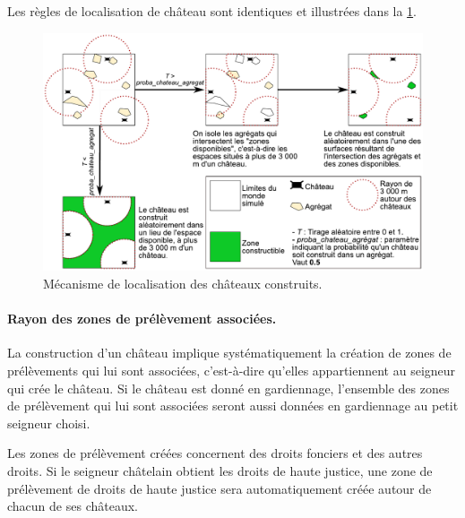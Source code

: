 Les règles de localisation de château sont identiques et illustrées dans la \cref{fig:construction-chateaux}.

\begin{figure}[H]
	\centering
	\includegraphics[width=\linewidth]{img/construction_chateaux.pdf}
	\caption{Mécanisme de localisation des châteaux construits.}
	\label{fig:construction-chateaux}
\end{figure}

\paragraph{Rayon des zones de prélèvement associées.}
La construction d'un château implique systématiquement la création de zones de prélèvements qui lui sont associées, c'est-à-dire qu'elles appartiennent au seigneur qui crée le château.
Si le château est donné en gardiennage, l'ensemble des zones de prélèvement qui lui sont associées seront aussi données en gardiennage au petit seigneur choisi.

Les zones de prélèvement créées concernent des droits fonciers et des autres droits.
Si le seigneur châtelain obtient les droits de haute justice, une zone de prélèvement de droits de haute justice sera automatiquement créée autour de chacun de ses châteaux.

